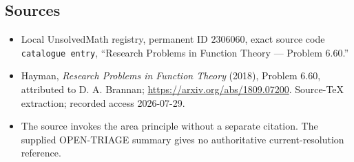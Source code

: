 \documentclass[11pt]{article}
\begin{document}
\subsection{Sources}
\begin{itemize}
\item Local UnsolvedMath registry, permanent ID \(2306060\), exact source code \texttt{catalogue entry}, ``Research Problems in Function Theory --- Problem 6.60.''
\item Hayman, \emph{Research Problems in Function Theory} (2018), Problem 6.60, attributed to D. A. Brannan; \url{https://arxiv.org/abs/1809.07200}. Source-TeX extraction; recorded access 2026-07-29.
\item The source invokes the area principle without a separate citation. The supplied OPEN-TRIAGE summary gives no authoritative current-resolution reference.
\end{itemize}
\end{document}
